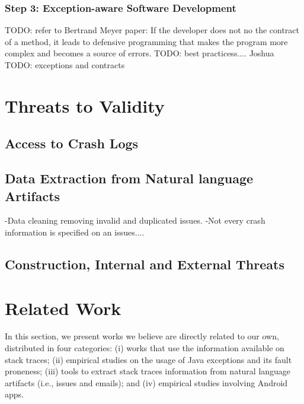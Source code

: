 \documentclass[conference]{IEEEtran}
\begin{document}
\subsubsection{Step 3: Exception-aware Software Development}
TODO: refer to Bertrand Meyer paper: If the developer does not no the contract of a method, it leads to defensive programming that makes the program more complex and becomes a source of errors.
TODO: best practicess.... Joshua
TODO: exceptions and contracts
 
\section{Threats to Validity}

\subsection{Access to Crash Logs}
\subsection{Data Extraction from Natural language Artifacts}

-Data cleaning removing invalid and duplicated issues.
-Not every crash information is specified on an issues....

\subsection{Construction, Internal and External Threats}

\section{Related Work}

In this section, we present works we believe are directly related to our own, distributed in four categories: (i) works that use the information available on stack traces; (ii) empirical studies on the usage of Java exceptions and its fault proneness; (iii) tools to extract stack traces information from natural language artifacts (i.e., issues and emails);  and (iv) empirical studies involving Android apps.
\end{document}
